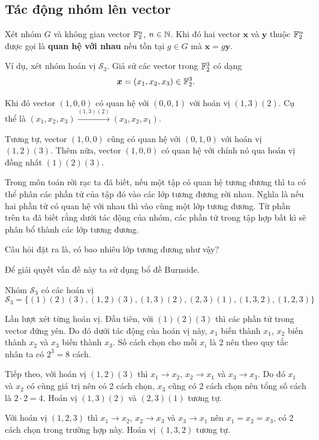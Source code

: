 \subsection*{Tác động nhóm lên vector}

Xét nhóm $G$ và không gian vector $\mathbb{F}_2^n$, $n \in \mathbb{N}$. Khi đó hai vector $\bm{x}$ và $\bm{y}$ thuộc $\mathbb{F}_2^n$ được gọi là \textbf{quan hệ với nhau} nếu tồn tại $g \in G$ mà $\bm{x} = g \bm{y}$.

Ví dụ, xét nhóm hoán vị $\mathcal{S}_3$. Giả sử các vector trong $\mathbb{F}_2^3$ có dạng \[ \bm{x} = (x_1, x_2, x_3) \in \mathbb{F}_2^3. \] 

Khi đó vector $(1, 0, 0)$ có quan hệ với $(0, 0, 1)$ với hoán vị $(1, 3)(2)$. Cụ thể là $(x_1, x_2, x_3) \xrightarrow{(1, 3)(2)} (x_3, x_2, x_1)$.

Tương tự, vector $(1, 0, 0)$ cũng có quan hệ với $(0, 1, 0)$ với hoán vị $(1, 2)(3)$. Thêm nữa, vector $(1, 0, 0)$ có quan hệ với chính nó qua hoán vị đồng nhất $(1)(2)(3)$.

Trong môn toán rời rạc ta đã biết, nếu một tập có quan hệ tương đương thì ta có thể phân các phần tử của tập đó vào các lớp tương đương rời nhau. Nghĩa là nếu hai phần tử có quan hệ với nhau thì vào cùng một lớp tương đương. Từ phần trên ta đã biết rằng dưới tác động của nhóm, các phần tử trong tập hợp bất kì sẽ phân bổ thành các lớp tương đương.

Câu hỏi đặt ra là, có bao nhiêu lớp tương đương như vậy?

Để giải quyết vấn đề này ta sử dụng bổ đề Burnside.

Nhóm $\mathcal{S}_3$ có các hoán vị \[ \mathcal{S}_3 = \{ (1)(2)(3), (1, 2)(3), (1, 3)(2), (2, 3)(1), (1, 3, 2), (1, 2, 3) \} \]

Lần lượt xét từng hoán vị. Đầu tiên, với $(1)(2)(3)$ thì các phần tử trong vector đứng yên. Do đó dưới tác động của hoán vị này, $x_1$ biến thành $x_1$, $x_2$ biến thành $x_2$ và $x_3$ biến thành $x_3$. Số cách chọn cho mỗi $x_i$ là 2 nên theo quy tắc nhân ta có $2^3 = 8$ cách.

Tiếp theo, với hoán vị $(1, 2)(3)$ thì $x_1 \to x_2$, $x_2 \to x_1$ và $x_3 \to x_3$. Do đó $x_1$ và $x_2$ có cùng giá trị nên có 2 cách chọn, $x_3$ cũng có 2 cách chọn nên tổng số cách là $2 \cdot 2 = 4$. Hoán vị $(1, 3)(2)$ và $(2, 3)(1)$ tương tự.

Với hoán vị $(1, 2, 3)$ thì $x_1 \to x_2$, $x_2 \to x_3$ và $x_3 \to x_1$ nên $x_1 = x_2 = x_3$, có 2 cách chọn trong trường hợp này. Hoán vị $(1, 3, 2)$ tương tự.

